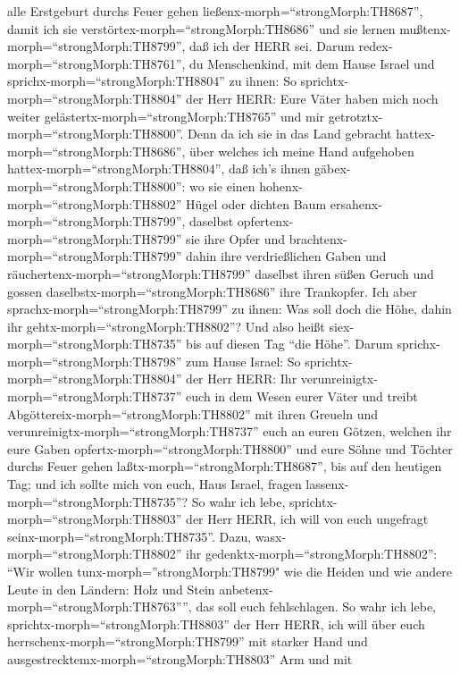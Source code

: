 alle Erstgeburt durchs Feuer gehen ließenx-morph=``strongMorph:TH8687'',
damit ich sie verstörtex-morph=``strongMorph:TH8686'' und sie lernen
mußtenx-morph=``strongMorph:TH8799'', daß ich der HERR sei.
 Darum redex-morph=``strongMorph:TH8761'', du Menschenkind,
mit dem Hause Israel und sprichx-morph=``strongMorph:TH8804'' zu ihnen:
So sprichtx-morph=``strongMorph:TH8804'' der Herr HERR: Eure Väter haben
mich noch weiter gelästertx-morph=``strongMorph:TH8765'' und mir
getrotztx-morph=``strongMorph:TH8800''.  Denn da ich sie in
das Land gebracht hattex-morph=``strongMorph:TH8686'', über welches ich
meine Hand aufgehoben hattex-morph=``strongMorph:TH8804'', daß ich's
ihnen gäbex-morph=``strongMorph:TH8800'': wo sie einen
hohenx-morph=``strongMorph:TH8802'' Hügel oder dichten Baum
ersahenx-morph=``strongMorph:TH8799'', daselbst
opfertenx-morph=``strongMorph:TH8799'' sie ihre Opfer und
brachtenx-morph=``strongMorph:TH8799'' dahin ihre verdrießlichen Gaben
und räuchertenx-morph=``strongMorph:TH8799'' daselbst ihren süßen Geruch
und gossen daselbstx-morph=``strongMorph:TH8686'' ihre Trankopfer.
 Ich aber sprachx-morph=``strongMorph:TH8799'' zu ihnen:
Was soll doch die Höhe, dahin ihr gehtx-morph=``strongMorph:TH8802''?
Und also heißt siex-morph=``strongMorph:TH8735'' bis auf diesen Tag
``die Höhe''.  Darum sprichx-morph=``strongMorph:TH8798''
zum Hause Israel: So sprichtx-morph=``strongMorph:TH8804'' der Herr
HERR: Ihr verunreinigtx-morph=``strongMorph:TH8737'' euch in dem Wesen
eurer Väter und treibt Abgöttereix-morph=``strongMorph:TH8802'' mit
ihren Greueln  und
verunreinigtx-morph=``strongMorph:TH8737'' euch an euren Götzen, welchen
ihr eure Gaben opfertx-morph=``strongMorph:TH8800'' und eure Söhne und
Töchter durchs Feuer gehen laßtx-morph=``strongMorph:TH8687'', bis auf
den heutigen Tag; und ich sollte mich von euch, Haus Israel, fragen
lassenx-morph=``strongMorph:TH8735''? So wahr ich lebe,
sprichtx-morph=``strongMorph:TH8803'' der Herr HERR, ich will von euch
ungefragt seinx-morph=``strongMorph:TH8735''.  Dazu,
wasx-morph=``strongMorph:TH8802'' ihr
gedenktx-morph=``strongMorph:TH8802'': ``Wir wollen
tunx-morph=''strongMorph:TH8799" wie die Heiden und wie andere Leute in
den Ländern: Holz und Stein anbetenx-morph=``strongMorph:TH8763'''', das
soll euch fehlschlagen.  So wahr ich lebe,
sprichtx-morph=``strongMorph:TH8803'' der Herr HERR, ich will über euch
herrschenx-morph=``strongMorph:TH8799'' mit starker Hand und
ausgestrecktemx-morph=``strongMorph:TH8803'' Arm und mit
